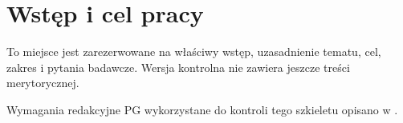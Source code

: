 \chapter{Wstęp i cel pracy}

To miejsce jest zarezerwowane na właściwy wstęp, uzasadnienie tematu, cel, zakres i pytania badawcze. Wersja kontrolna nie zawiera jeszcze treści merytorycznej.

Wymagania redakcyjne PG wykorzystane do kontroli tego szkieletu opisano w \cite{PGRectorOrder452024}.
